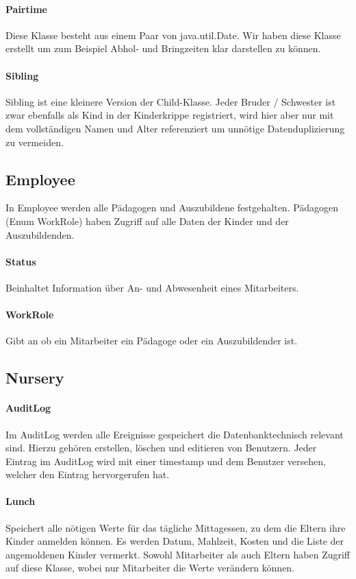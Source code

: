 \paragraph{Pairtime}
	Diese Klasse besteht aus einem Paar von java.util.Date. Wir haben diese Klasse erstellt um zum Beispiel Abhol- und Bringzeiten klar darstellen zu können. 
\paragraph{Sibling}
	Sibling ist eine kleinere Version der Child-Klasse. Jeder Bruder / Schwester ist zwar ebenfalls als Kind in der Kinderkrippe registriert, wird hier aber nur mit dem vollständigen Namen und Alter referenziert um unnötige Datenduplizierung zu vermeiden. 

\subsection{Employee}
	In Employee werden alle Pädagogen und Auszubildene festgehalten. Pädagogen (Enum WorkRole) haben Zugriff auf alle Daten der Kinder und der Auszubildenden. 
\paragraph{Status}
	Beinhaltet Information über An- und Abwesenheit eines Mitarbeiters. 
\paragraph{WorkRole}
	Gibt an ob ein Mitarbeiter ein Pädagoge oder ein Auszubildender ist.
	
\subsection{Nursery}
\paragraph{AuditLog}
	Im AuditLog werden alle Ereignisse gespeichert die Datenbanktechnisch relevant sind. Hierzu gehören erstellen, löschen und editieren von Benutzern. Jeder Eintrag im AuditLog wird mit einer timestamp und dem Benutzer versehen, welcher den Eintrag hervorgerufen hat. 
\paragraph{Lunch}
	Speichert alle nötigen Werte für das tägliche Mittagessen, zu dem die Eltern ihre Kinder anmelden können. Es werden Datum, Mahlzeit, Kosten und die Liste der angemoldenen Kinder vermerkt. Sowohl Mitarbeiter als auch Eltern haben Zugriff auf diese Klasse, wobei nur Mitarbeiter die Werte verändern können.
